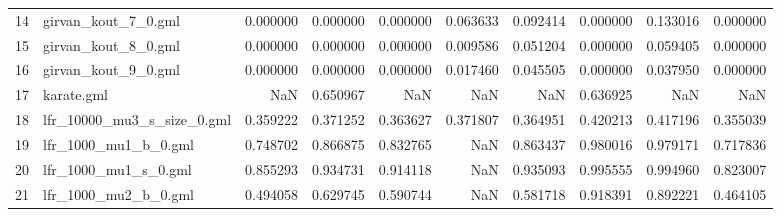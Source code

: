\begin{tabular}{llrrrrrrrr}
14 &         girvan\_kout\_7\_0.gml &                            0.000000 &                       0.000000 &                          0.000000 &                      0.063633 &                        0.092414 &                     0.000000 &                            0.133016 &                                0.000000 \\
15 &         girvan\_kout\_8\_0.gml &                            0.000000 &                       0.000000 &                          0.000000 &                      0.009586 &                        0.051204 &                     0.000000 &                            0.059405 &                                0.000000 \\
16 &         girvan\_kout\_9\_0.gml &                            0.000000 &                       0.000000 &                          0.000000 &                      0.017460 &                        0.045505 &                     0.000000 &                            0.037950 &                                0.000000 \\
17 &                  karate.gml &                                 NaN &                       0.650967 &                               NaN &                           NaN &                             NaN &                     0.636925 &                                 NaN &                                     NaN \\
18 &  lfr\_10000\_mu3\_s\_size\_0.gml &                            0.359222 &                       0.371252 &                          0.363627 &                      0.371807 &                        0.364951 &                     0.420213 &                            0.417196 &                                0.355039 \\
19 &        lfr\_1000\_mu1\_b\_0.gml &                            0.748702 &                       0.866875 &                          0.832765 &                           NaN &                        0.863437 &                     0.980016 &                            0.979171 &                                0.717836 \\
20 &        lfr\_1000\_mu1\_s\_0.gml &                            0.855293 &                       0.934731 &                          0.914118 &                           NaN &                        0.935093 &                     0.995555 &                            0.994960 &                                0.823007 \\
21 &        lfr\_1000\_mu2\_b\_0.gml &                            0.494058 &                       0.629745 &                          0.590744 &                           NaN &                        0.581718 &                     0.918391 &                            0.892221 &                                0.464105 \\

\end{tabular}
